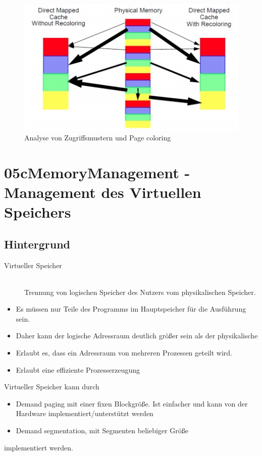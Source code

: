\documentclass[a4paper]{scrreprt}
\begin{document}
\begin{figure}[ht]
\centering
\includegraphics[scale=0.5]{graphics/pagecoloring.png}
\caption{Analyse von Zugriffsmustern und Page coloring}
\end{figure}


\chapter{05cMemoryManagement - Management des Virtuellen Speichers}

\section{Hintergrund}

\begin{description}
\item [Virtueller Speicher]\ \\ Trennung von logischen Speicher des Nutzers vom physikalischen Speicher.
\end{description}
\begin{itemize}
\item Es müssen nur Teile des Programms im Hauptspeicher für die Ausführung sein.
\item Daher kann der logische Adressraum deutlich größer sein als der physikalische
\item Erlaubt es, dass ein Adressraum von mehreren Prozessen geteilt wird.
\item Erlaubt eine effiziente Prozesserzeugung
\end{itemize}

Virtueller Speicher kann durch
\begin{itemize}
\item Demand paging mit einer fixen Blockgröße. Ist einfacher und kann von der Hardware implementiert/unterstützt werden
\item Demand segmentation, mit Segmenten beliebiger Größe
\end{itemize}
implementiert werden.
\end{document}
